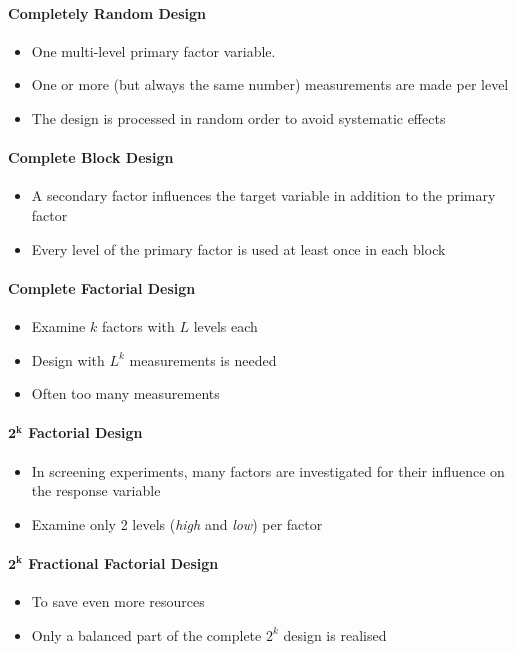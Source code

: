 \documentclass[11pt]{article}
\theoremstyle{definition}
\begin{document}
\paragraph{Completely Random Design}
\begin{itemize}[nosep]
	\item One multi-level primary factor variable.
	\item One or more (but always the same number) measurements are made per level
	\item The design is processed in random order to avoid systematic effects
\end{itemize}

\paragraph{Complete Block Design}
\begin{itemize}[nosep]
	\item A secondary factor influences the target variable in addition to the primary factor
	\item Every level of the primary factor is used at least once in each block
\end{itemize}

\paragraph{Complete Factorial Design}
\begin{itemize}[nosep]
	\item Examine $k$ factors with $L$ levels each
	\item Design with $L^k$ measurements is needed
	\item Often too many measurements
\end{itemize}

\paragraph{$\bm{2^k}$ Factorial Design}
\begin{itemize}[nosep]
	\item In screening experiments, many factors are investigated for their influence on the response variable
	\item Examine only 2 levels (\textit{high} and \textit{low}) per factor
\end{itemize}

\paragraph{$\bm{2^k}$ Fractional Factorial Design}
\begin{itemize}[nosep]
	\item To save even more resources
	\item Only a balanced part of the complete $2^k$ design is realised
\end{itemize}
\end{document}
